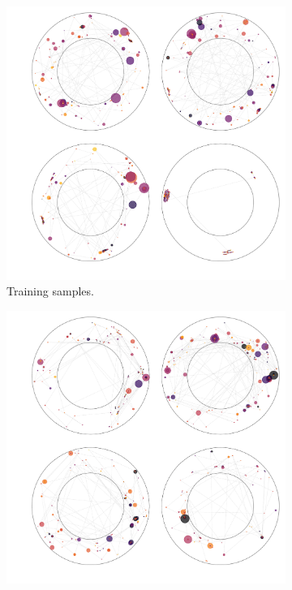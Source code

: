 \begin{figure}
    \centering
    \begin{subfigure}[t]{0.48\textwidth}
        \centering
        \hspace{-1cm} %
        \includegraphics[width=\textwidth]{chapter4/grid_real_4.pdf}
        \caption{Training samples.}
    \end{subfigure}
    \quad
    \begin{subfigure}[t]{0.48\textwidth}
        \centering
        \hspace{-1cm} %
        \includegraphics[width=\textwidth]{chapter4/grid_fake_4.pdf}

\end{subfigure}
\end{figure}
